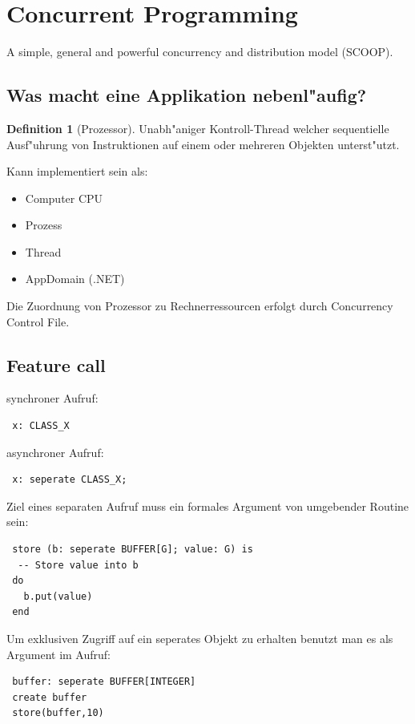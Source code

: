 \documentclass[german, 10pt, a4paper, twocolumn]{scrartcl}
\theoremstyle{definition}
\newtheorem*{definition}{Definition}
\begin{document}
\section{Concurrent Programming}

A simple, general and powerful concurrency and distribution model (SCOOP).

\subsection{Was macht eine Applikation nebenl"aufig?}

\begin{definition}[Prozessor]
	Unabh"aniger Kontroll-Thread welcher sequentielle Ausf"uhrung von Instruktionen auf einem oder mehreren Objekten unterst"utzt.
\end{definition}

Kann implementiert sein als:
\begin{itemize}
	\item Computer CPU
	\item Prozess
	\item Thread
	\item AppDomain (.NET)
\end{itemize}

Die Zuordnung von Prozessor zu Rechnerressourcen erfolgt durch Concurrency Control File.

\subsection{Feature call}

synchroner Aufruf:
\begin{verbatim}
 x: CLASS_X
\end{verbatim}

asynchroner Aufruf:
\begin{verbatim}
 x: seperate CLASS_X;
\end{verbatim}

Ziel eines separaten Aufruf muss ein formales Argument von umgebender Routine sein:
\begin{verbatim}
 store (b: seperate BUFFER[G]; value: G) is
  -- Store value into b
 do
   b.put(value)
 end
\end{verbatim}

Um exklusiven Zugriff auf ein seperates Objekt zu erhalten benutzt man es als Argument im Aufruf:
\begin{verbatim}
 buffer: seperate BUFFER[INTEGER]
 create buffer
 store(buffer,10)
\end{verbatim}
\end{document}
